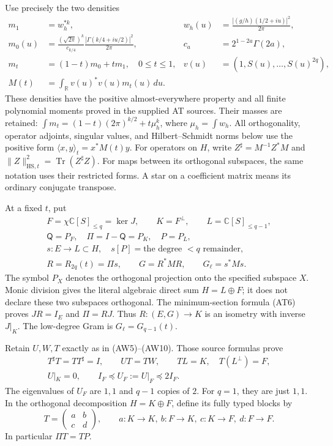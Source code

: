 Use precisely the two densities
\[
 \begin{aligned}
 m_1&=w_h^{*k},&
 w_h(u)&=\frac{|(g/h)(1/2+iu)|^2}{2\pi},\\
 m_0(u)&=\frac{(\sqrt{2\pi})^k}{c_{k/4}}
                  \frac{|\Gamma(k/4+iu/2)|^2}{2\pi},&
 c_a&=2^{1-2a}\Gamma(2a),\\
 m_t&=(1-t)m_0+tm_1,\quad 0\le t\le1,&
 v(u)&=(1,S(u),\ldots,S(u)^{2q}),\\
 M(t)&=\int_{\mathbb R}v(u)^*v(u)m_t(u)\,du.
 \end{aligned}
 \tag{QT.3}\label{eq:qt-metric}
\]
These densities have the positive almost-everywhere property and all
finite polynomial moments proved in the supplied AT sources. Their
masses are retained:
\(\int m_t=(1-t)(2\pi)^{k/2}+t\mu_h^k\), where
\(\mu_h=\int w_h\).
All orthogonality, operator adjoints, singular values, and
Hilbert--Schmidt norms below use the positive form
\(\langle x,y\rangle_t=x^*M(t)y\).
For operators on \(H\), write \(Z^\sharp=M^{-1}Z^*M\) and
\(\|Z\|_{\mathrm{HS},t}^2=\operatorname{Tr}(Z^\sharp Z)\).
For maps between its orthogonal subspaces, the same notation uses their
restricted forms. A star on a coefficient matrix means its ordinary
conjugate transpose.

At a fixed \(t\), put
\[
 \begin{gathered}
 F=\chi\mathbb C[S]_{\le q}=\ker J,\qquad K=F^\perp,\qquad
 L=\mathbb C[S]_{\le q-1},\\
 \mathsf Q=P_F,\quad \Pi=I-\mathsf Q=P_K,\quad P=P_L,\\
 s:E\longrightarrow L\subset H,\quad s[P]=\text{the degree }<q
       \text{ remainder},\\
 R=R_{2q}(t)=\Pi s,\qquad
 G=R^*MR,\qquad G_\ell=s^*Ms.
 \end{gathered}
 \tag{QT.4}\label{eq:qt-splitting}
\]
The symbol \(P_X\) denotes the orthogonal projection onto the specified
subspace \(X\). Monic division gives the literal algebraic direct sum
\(H=L\oplus F\); it does not declare these two subspaces orthogonal.
The minimum-section formula (AT6) proves \(JR=I_E\) and
\(\Pi=RJ\). Thus \(R:(E,G)\to K\) is an isometry with inverse
\(J|_K\). The low-degree Gram is \(G_\ell=G_{q-1}(t)\).

Retain \(U,W,T\) exactly as in (AW5)--(AW10). Those source formulas prove
\[
 \begin{gathered}
 T^\sharp T=TT^\sharp=I,\qquad UT=TW,\qquad
 TL=K,\quad T(L^\perp)=F,\\
 U|_K=0,\qquad I_F\preceq U_F:=U|_F\preceq2I_F.
 \end{gathered}
 \tag{QT.5}\label{eq:qt-inputT}
\]
The eigenvalues of \(U_F\) are \(1,1\) and \(q-1\) copies of \(2\).
For \(q=1\), they are just \(1,1\).
In the orthogonal decomposition \(H=K\oplus F\), define its fully typed
blocks by
\[
 T=\begin{pmatrix}a&b\\c&d\end{pmatrix},\qquad
 a:K\to K,\ b:F\to K,\ c:K\to F,\ d:F\to F.
 \tag{QT.6}\label{eq:qt-blocks}
\]
In particular \(\Pi T=TP\).

